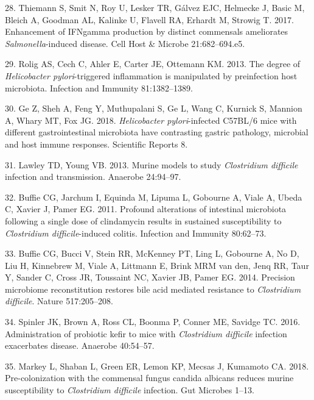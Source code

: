 \documentclass[
  11pt,
]{article}
\begin{document}
\leavevmode\hypertarget{ref-Thiemann2017}{}%
28. Thiemann S, Smit N, Roy U, Lesker TR, Gálvez EJC, Helmecke J, Basic
M, Bleich A, Goodman AL, Kalinke U, Flavell RA, Erhardt M, Strowig T.
2017. Enhancement of IFNgamma production by distinct commensals
ameliorates \emph{Salmonella}-induced disease. Cell Host \& Microbe
21:682--694.e5.

\leavevmode\hypertarget{ref-Rolig2013}{}%
29. Rolig AS, Cech C, Ahler E, Carter JE, Ottemann KM. 2013. The degree
of \emph{Helicobacter pylori}-triggered inflammation is manipulated by
preinfection host microbiota. Infection and Immunity 81:1382--1389.

\leavevmode\hypertarget{ref-Ge2018}{}%
30. Ge Z, Sheh A, Feng Y, Muthupalani S, Ge L, Wang C, Kurnick S,
Mannion A, Whary MT, Fox JG. 2018. \emph{Helicobacter pylori}-infected
C57BL/6 mice with different gastrointestinal microbiota have contrasting
gastric pathology, microbial and host immune responses. Scientific
Reports 8.

\leavevmode\hypertarget{ref-Lawley2013}{}%
31. Lawley TD, Young VB. 2013. Murine models to study \emph{Clostridium
difficile} infection and transmission. Anaerobe 24:94--97.

\leavevmode\hypertarget{ref-Buffie2011}{}%
32. Buffie CG, Jarchum I, Equinda M, Lipuma L, Gobourne A, Viale A,
Ubeda C, Xavier J, Pamer EG. 2011. Profound alterations of intestinal
microbiota following a single dose of clindamycin results in sustained
susceptibility to \emph{Clostridium difficile}-induced colitis.
Infection and Immunity 80:62--73.

\leavevmode\hypertarget{ref-Buffie2014}{}%
33. Buffie CG, Bucci V, Stein RR, McKenney PT, Ling L, Gobourne A, No D,
Liu H, Kinnebrew M, Viale A, Littmann E, Brink MRM van den, Jenq RR,
Taur Y, Sander C, Cross JR, Toussaint NC, Xavier JB, Pamer EG. 2014.
Precision microbiome reconstitution restores bile acid mediated
resistance to \emph{Clostridium difficile}. Nature 517:205--208.

\leavevmode\hypertarget{ref-Spinler2016}{}%
34. Spinler JK, Brown A, Ross CL, Boonma P, Conner ME, Savidge TC. 2016.
Administration of probiotic kefir to mice with \emph{Clostridium
difficile} infection exacerbates disease. Anaerobe 40:54--57.

\leavevmode\hypertarget{ref-Markey2018}{}%
35. Markey L, Shaban L, Green ER, Lemon KP, Mecsas J, Kumamoto CA. 2018.
Pre-colonization with the commensal fungus candida albicans reduces
murine susceptibility to \emph{Clostridium difficile} infection. Gut
Microbes 1--13.
\end{document}
